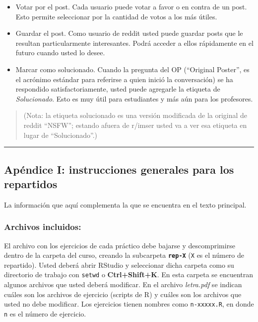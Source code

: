 \documentclass[]{article}
\begin{document}
\begin{itemize}
\item
  Votar por el post. Cada usuario puede votar a favor o en contra de un
  post. Esto permite seleccionar por la cantidad de votos a los más
  útiles.
\item
  Guardar el post. Como usuario de reddit usted puede guardar posts que
  le resultan particularmente interesantes. Podrá acceder a ellos
  rápidamente en el futuro cuando usted lo desee.
\item
  Marcar como solucionado. Cuando la pregunta del OP (``Original
  Poster'', es el acrónimo estándar para referirse a quien inició la
  conversación) se ha respondido satisfactoriamente, usted puede
  agregarle la etiqueta de \emph{Solucionado}. Esto es muy útil para
  estudiantes y más aún para los profesores.
\end{itemize}
\begin{quote}
(Nota: la etiqueta solucionado es una versión modificada de la original
de reddit ``NSFW''; estando afuera de r/imser usted va a ver esa
etiqueta en lugar de ``Solucionado''.)

\end{quote}
\begin{center}\rule{3in}{0.4pt}\end{center}

\subsection{Apéndice I: instrucciones generales para los repartidos}

La información que aquí complementa la que se encuentra en el texto
principal.

\subsubsection{Archivos incluidos:}

El archivo con los ejercicios de cada práctico debe bajarse y
descomprimirse dentro de la carpeta del curso, creando la subcarpeta
\textbf{\texttt{rep-X}} (\texttt{X} es el número de repartido). Usted
deberá abrir RStudio y seleccionar dicha carpeta como su directorio de
trabajo con \texttt{setwd} o \textbf{Ctrl+Shift+K}. En esta carpeta se
encuentran algunos archivos que usted deberá modificar. En el archivo
\emph{letra.pdf} se indican cuáles son los archivos de ejercicio
(scripts de R) y cuáles son los archivos que usted no debe modificar.
Los ejercicios tienen nombres como \texttt{n-xxxxx.R}, en donde
\texttt{n} es el número de ejercicio.
\end{document}
